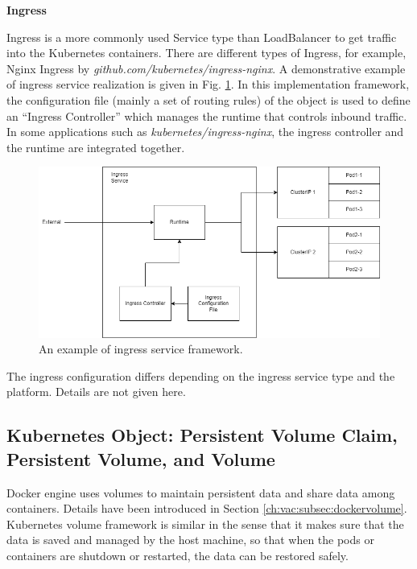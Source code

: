 \vspace{0.1in}
\noindent \textbf{Ingress}
\vspace{0.1in}

Ingress is a more commonly used Service type than LoadBalancer to get traffic into the Kubernetes containers. There are different types of Ingress, for example, Nginx Ingress by \textit{github.com/kubernetes/ingress-nginx}. A demonstrative example of ingress service realization is given in Fig. \ref{ch:vac:fig:ingress_service}. In this implementation framework, the configuration file (mainly a set of routing rules) of the object is used to define an ``Ingress Controller'' which manages the runtime that controls inbound traffic. In some applications such as \textit{kubernetes/ingress-nginx}, the ingress controller and the runtime are integrated together.

\begin{figure}[htbp]
	\centering
	\includegraphics[width=350pt]{chapters/part-3/figures/ingress_service.png}
	\caption{An example of ingress service framework.} \label{ch:vac:fig:ingress_service}
\end{figure}

The ingress configuration differs depending on the ingress service type and the platform. Details are not given here.

\subsection{Kubernetes Object: Persistent Volume Claim, Persistent Volume, and Volume} \label{ch:vac:subsec:k8svolume}

Docker engine uses volumes to maintain persistent data and share data among containers. Details have been introduced in Section \ref{ch:vac:subsec:dockervolume}. Kubernetes volume framework is similar in the sense that it makes sure that the data is saved and managed by the host machine, so that when the pods or containers are shutdown or restarted, the data can be restored safely.

